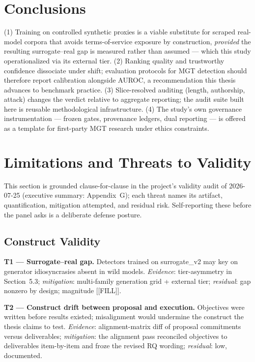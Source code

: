 \section{Conclusions}
(1) Training on controlled synthetic proxies is a viable substitute for
scraped real-model corpora that avoids terms-of-service exposure by
construction, \emph{provided} the resulting surrogate--real gap is
measured rather than assumed --- which this study operationalized via its
external tier. (2) Ranking quality and trustworthy confidence dissociate
under shift; evaluation protocols for MGT detection should therefore
report calibration alongside AUROC, a recommendation this thesis advances
to benchmark practice. (3) Slice-resolved auditing (length, authorship,
attack) changes the verdict relative to aggregate reporting; the audit
suite built here is reusable methodological infrastructure. (4) The
study's own governance instrumentation --- frozen gates, provenance
ledgers, dual reporting --- is offered as a template for first-party MGT
research under ethics constraints.

\section{Limitations and Threats to Validity}
This section is grounded clause-for-clause in the project's validity audit
of 2026-07-25 (executive summary: Appendix~G); each threat names its
artifact, quantification, mitigation attempted, and residual risk.
Self-reporting these before the panel asks is a deliberate defense posture.

\subsection{Construct Validity}
\textbf{T1 --- Surrogate--real gap.} Detectors trained on surrogate\_v2 may
key on generator idiosyncrasies absent in wild models. \emph{Evidence}:
tier-asymmetry in Section~5.3; \emph{mitigation}: multi-family generation
grid + external tier; \emph{residual}: gap nonzero by design; magnitude
[[FILL]].

\textbf{T2 --- Construct drift between proposal and execution.} Objectives
were written before results existed; misalignment would undermine the
construct the thesis claims to test. \emph{Evidence}: alignment-matrix
diff of proposal commitments versus deliverables; \emph{mitigation}: the
alignment pass reconciled objectives to deliverables item-by-item and
froze the revised RQ wording; \emph{residual}: low, documented.

